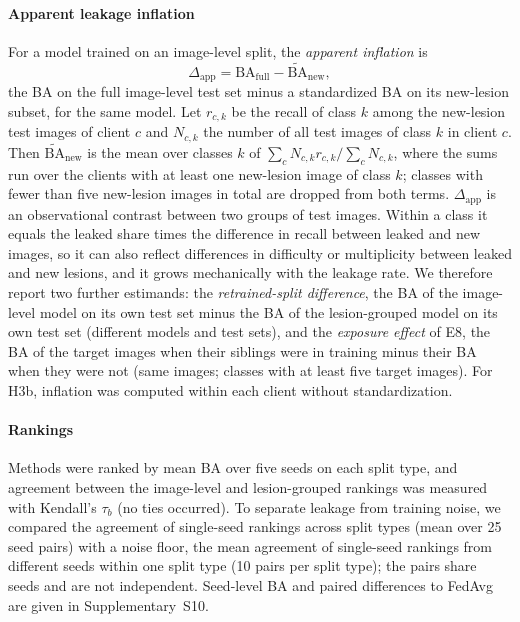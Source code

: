 \documentclass[VANCOUVER,Times1COL]{WileyNJDv5}
\begin{document}
\paragraph{Apparent leakage inflation} For a model trained on an image-level split, the \emph{apparent
inflation} is
\begin{equation}
  \Delta_{\text{app}} = \mathrm{BA}_{\text{full}} - \widetilde{\mathrm{BA}}_{\text{new}},
  \label{eq:inflation}
\end{equation}
the BA on the full image-level test set minus a standardized BA on its new-lesion subset, for the same
model. Let $r_{c,k}$ be the recall of class $k$ among the new-lesion test images of client $c$ and $N_{c,k}$
the number of all test images of class $k$ in client $c$. Then $\widetilde{\mathrm{BA}}_{\text{new}}$ is
the mean over classes $k$ of $\sum_c N_{c,k} r_{c,k}/\sum_c N_{c,k}$, where the sums run over the clients
with at least one new-lesion image of class $k$; classes with fewer than five new-lesion images in total
are dropped from both terms. $\Delta_{\text{app}}$ is an observational contrast between two groups of test
images. Within a class it equals the leaked share times the difference in recall between leaked and new
images, so it can also reflect differences in difficulty or multiplicity between leaked and new lesions,
and it grows mechanically with the leakage rate. We therefore report two further estimands: the
\emph{retrained-split difference}, the BA of the image-level model on its own test set minus the BA of the
lesion-grouped model on its own test set (different models and test sets), and the \emph{exposure effect}
of E8, the BA of the target images when their siblings were in training minus their BA when they were
not (same images; classes with at least five target images). For H3b, inflation was computed within each
client without standardization.

\paragraph{Rankings} Methods were ranked by mean BA over five seeds on each split type, and agreement
between the image-level and lesion-grouped rankings was measured with Kendall's $\tau_b$ (no ties occurred). To separate leakage from training noise, we compared the
agreement of single-seed rankings across split types (mean over 25 seed pairs) with a noise floor, the
mean agreement of single-seed rankings from different seeds within one split type (10 pairs per split
type); the pairs share seeds and are not independent. Seed-level BA and paired differences to FedAvg are given in
Supplementary~S10.
\end{document}
